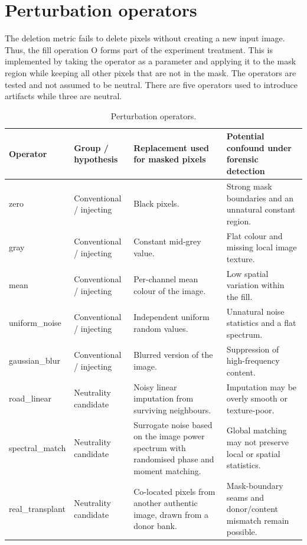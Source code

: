 \section{\texorpdfstring{\textbf{Perturbation
operators}}{Perturbation operators}}\label{perturbation-operators}

The deletion metric fails to delete pixels without creating a new input
image. Thus, the fill operation O forms part of the experiment
treatment. This is implemented by taking the operator as a parameter and
applying it to the mask region while keeping all other pixels that are
not in the mask. The operators are tested and not assumed to be neutral.
There are five operators used to introduce artifacts while three are
neutral.

\begin{table}[H]
    \centering
    \caption{Perturbation operators.}
    \label{tab:perturbation-operators}
    \small
    \begin{tabular}{@{}>{\raggedright\arraybackslash}p{}>{\raggedright\arraybackslash}p{}>{\raggedright\arraybackslash}p{}>{\raggedright\arraybackslash}p{}@{}}
        \toprule
        \textbf{Operator} & \textbf{Group / hypothesis} & \textbf{Replacement used for masked pixels} & \textbf{Potential confound under forensic detection} \\
        \midrule
        zero & Conventional / injecting & Black pixels. & Strong mask boundaries and an unnatural constant region. \\
        \addlinespace
        gray & Conventional / injecting & Constant mid-grey value. & Flat colour and missing local image texture. \\
        \addlinespace
        mean & Conventional / injecting & Per-channel mean colour of the image. & Low spatial variation within the fill. \\
        \addlinespace
        uniform\_noise & Conventional / injecting & Independent uniform random values. & Unnatural noise statistics and a flat spectrum. \\
        \addlinespace
        gaussian\_blur & Conventional / injecting & Blurred version of the image. & Suppression of high-frequency content. \\
        \addlinespace
        road\_linear & Neutrality candidate & Noisy linear imputation from surviving neighbours. & Imputation may be overly smooth or texture-poor. \\
        \addlinespace
        spectral\_match & Neutrality candidate & Surrogate noise based on the image power spectrum with randomised phase and moment matching. & Global matching may not preserve local or spatial statistics. \\
        \addlinespace
        real\_transplant & Neutrality candidate & Co-located pixels from another authentic image, drawn from a donor bank. & Mask-boundary seams and donor/content mismatch remain possible. \\
        \bottomrule
    \end{tabular}
\end{table}

